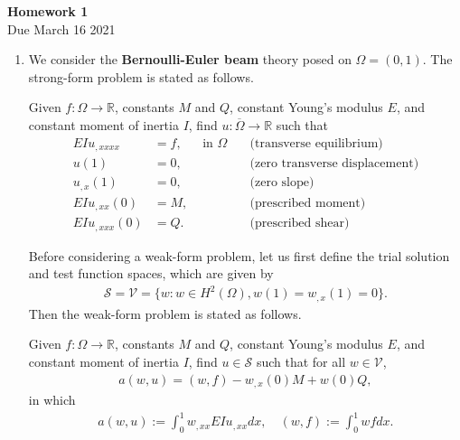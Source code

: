 \documentclass[12pt]{article}
\begin{document}
\begin{center}
\textbf{\Large
Homework 1
}\\
\normalsize Due March 16 2021





\end{center}
\begin{enumerate}
\item We consider the \textbf{Bernoulli-Euler beam} theory posed on $\Omega = (0,1)$. The strong-form problem is stated as follows.

Given $f : \Omega \rightarrow \mathbb R$, constants $M$ and $Q$, constant Young's modulus $E$, and constant moment of inertia $I$, find $u : \overline{\Omega} \rightarrow \mathbb R$ such that
\begin{align*}
E I u_{,xxxx} &= f, & \mbox{ in } \Omega \quad & \mbox{(transverse equilibrium)} \\
u(1) & = 0, &  & \mbox{(zero transverse displacement)} \\
u_{,x}(1) &= 0, &  & \mbox{(zero slope)} \\
E I u_{,xx}(0) &= M, & & \mbox{(prescribed moment)} \\
E I u_{,xxx}(0) &= Q. & & \mbox{(prescribed shear)}
\end{align*}


Before considering a weak-form problem, let us first define the trial solution and test function spaces, which are given by
\begin{align*}
\mathcal S = \mathcal V = \Big\lbrace w : w \in H^2(\Omega), w(1) = w_{,x}(1) = 0 \Big\rbrace.
\end{align*}
Then the weak-form problem is stated as follows. 

Given $f : \Omega \rightarrow \mathbb R$, constants $M$ and $Q$, constant Young's modulus $E$, and constant moment of inertia $I$, find $u \in \mathcal S$ such that for all $w \in \mathcal V$,
\begin{align*}
a(w,u) = (w,f) - w_{,x}(0) M + w(0)Q,
\end{align*}
in which
\begin{align*}
a(w,u) := \int_{0}^{1} w_{,xx}E I u_{,xx} dx, \quad (w,f) := \int_0^1 wf dx.
\end{align*}


\end{enumerate}
\end{document}
